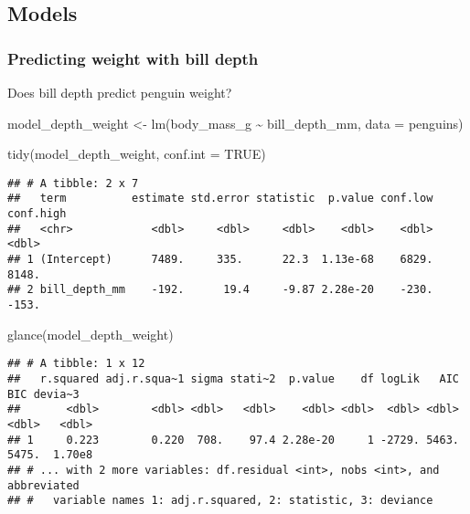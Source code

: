 \documentclass[
]{article}
\newenvironment{Shaded}{\begin{snugshade}}{\end{snugshade}}
\newcommand{\AttributeTok}[1]{\textcolor[rgb]{0.77,0.63,0.00}{#1}}
\newcommand{\ConstantTok}[1]{\textcolor[rgb]{0.00,0.00,0.00}{#1}}
\newcommand{\FunctionTok}[1]{\textcolor[rgb]{0.00,0.00,0.00}{#1}}
\newcommand{\NormalTok}[1]{#1}
\newcommand{\OtherTok}[1]{\textcolor[rgb]{0.56,0.35,0.01}{#1}}
\newcommand{\SpecialCharTok}[1]{\textcolor[rgb]{0.00,0.00,0.00}{#1}}
\begin{document}
\hypertarget{models}{%
\subsection{Models}\label{models}}

\hypertarget{predicting-weight-with-bill-depth}{%
\subsubsection{Predicting weight with bill
depth}\label{predicting-weight-with-bill-depth}}

Does bill depth predict penguin weight?

\begin{Shaded}
\begin{Highlighting}[]
\NormalTok{model\_depth\_weight }\OtherTok{\textless{}{-}} \FunctionTok{lm}\NormalTok{(body\_mass\_g }\SpecialCharTok{\textasciitilde{}}\NormalTok{ bill\_depth\_mm,}
                         \AttributeTok{data =}\NormalTok{ penguins)}

\FunctionTok{tidy}\NormalTok{(model\_depth\_weight, }\AttributeTok{conf.int =} \ConstantTok{TRUE}\NormalTok{)}
\end{Highlighting}
\end{Shaded}

\begin{verbatim}
## # A tibble: 2 x 7
##   term          estimate std.error statistic  p.value conf.low conf.high
##   <chr>            <dbl>     <dbl>     <dbl>    <dbl>    <dbl>     <dbl>
## 1 (Intercept)      7489.     335.      22.3  1.13e-68    6829.     8148.
## 2 bill_depth_mm    -192.      19.4     -9.87 2.28e-20    -230.     -153.
\end{verbatim}

\begin{Shaded}
\begin{Highlighting}[]
\FunctionTok{glance}\NormalTok{(model\_depth\_weight)}
\end{Highlighting}
\end{Shaded}

\begin{verbatim}
## # A tibble: 1 x 12
##   r.squared adj.r.squa~1 sigma stati~2  p.value    df logLik   AIC   BIC devia~3
##       <dbl>        <dbl> <dbl>   <dbl>    <dbl> <dbl>  <dbl> <dbl> <dbl>   <dbl>
## 1     0.223        0.220  708.    97.4 2.28e-20     1 -2729. 5463. 5475.  1.70e8
## # ... with 2 more variables: df.residual <int>, nobs <int>, and abbreviated
## #   variable names 1: adj.r.squared, 2: statistic, 3: deviance
\end{verbatim}
\end{document}
